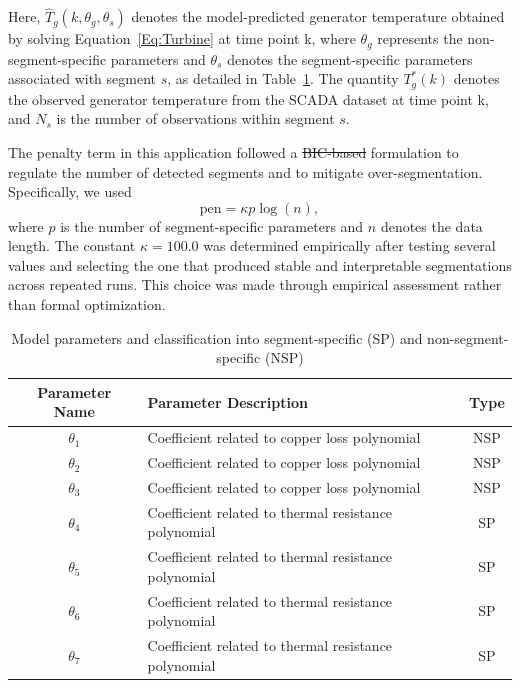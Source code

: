 \documentclass[10pt,letterpaper]{article}
\makeatletter
\providecommand{\DIFaddtex}[1]{{\protect\color{blue}\uwave{#1}}} %
\providecommand{\DIFdeltex}[1]{{\protect\color{red}\sout{#1}}} %
\providecommand{\DIFaddbegin}{} %
\providecommand{\DIFaddend}{} %
\providecommand{\DIFdelbegin}{} %
\providecommand{\DIFdelend}{} %
\providecommand{\DIFadd}[1]{\texorpdfstring{\DIFaddtex{#1}}{#1}} %
\providecommand{\DIFdel}[1]{\texorpdfstring{\DIFdeltex{#1}}{}} %
\providecommand{\DIFscaledelfig}{0.5}
\newlength{\DIFdelgraphicswidth} %
\newlength{\DIFdelgraphicsheight} %
\providecommand{\DIFaddincludegraphics}[2][]{{\color{blue}\fbox{\DIFOincludegraphics[#1]{#2}}}} %
\providecommand{\DIFdelincludegraphics}[2][]{%
\sbox{\DIFdelgraphicsbox}{\DIFOincludegraphics[#1]{#2}}%
\settoboxwidth{\DIFdelgraphicswidth}{\DIFdelgraphicsbox} %
\settoboxtotalheight{\DIFdelgraphicsheight}{\DIFdelgraphicsbox} %
\scalebox{\DIFscaledelfig}{%
\parbox[b]{\DIFdelgraphicswidth}{\usebox{\DIFdelgraphicsbox}\\[-\baselineskip] \rule{\DIFdelgraphicswidth}{0em}}\llap{\resizebox{\DIFdelgraphicswidth}{\DIFdelgraphicsheight}{%
\setlength{\unitlength}{\DIFdelgraphicswidth}%
\begin{picture}(1,1)%
\thicklines\linethickness{2pt} %
{\color[rgb]{1,0,0}\put(0,0){\framebox(1,1){}}}%
{\color[rgb]{1,0,0}\put(0,0){\line( 1,1){1}}}%
{\color[rgb]{1,0,0}\put(0,1){\line(1,-1){1}}}%
\end{picture}%
}\hspace*{3pt}}} %
} %
\DeclareRobustCommand{\DIFaddbegin}{\DIFOaddbegin \let\includegraphics\DIFaddincludegraphics} %
\DeclareRobustCommand{\DIFaddend}{\DIFOaddend \let\includegraphics\DIFOincludegraphics} %
\DeclareRobustCommand{\DIFdelbegin}{\DIFOdelbegin \let\includegraphics\DIFdelincludegraphics} %
\DeclareRobustCommand{\DIFdelend}{\DIFOaddend \let\includegraphics\DIFOincludegraphics} %
\let\sout@orig\sout %
\renewcommand{\sout}[1]{\ifmmode\text{\sout@orig{\ensuremath{#1}}}\else\sout@orig{#1}\fi} %
\makeatother
\begin{document}
Here, \(\hat{T}_g(k,\theta_g,\theta_s)\) denotes the model-predicted
generator temperature obtained by solving
Equation~\ref{Eq:Turbine} at time point k, where \(\theta_g\) represents the
non-segment-specific parameters and
\(\theta_s\) denotes the segment-specific parameters associated with
segment \(s\), as detailed in Table~\ref{table:TurbinParameters}.
The quantity \(T_g^*(k)\) denotes the observed generator temperature
from the SCADA dataset at time point k, and \(N_s\) is the number of observations within
segment \(s\).

The penalty term in this application followed a \DIFdelbegin \DIFdel{BIC-based }\DIFdelend \DIFaddbegin \DIFadd{complexity-penalty }\DIFaddend formulation to regulate the number of detected segments and to mitigate over-segmentation. Specifically, we used
\[
\text{pen} = \kappa  p  \log(n),
\]
where \( p \) is the number of segment-specific parameters and \( n \) denotes the data length. The constant \( \kappa = 100.0 \) was determined empirically after testing several values and selecting the one that produced stable and interpretable segmentations across repeated runs. This choice was made through empirical assessment rather than formal optimization.

\begin{table}[h]
\centering
\begin{tabular}{|c|l|c|}
\hline
\textbf{Parameter Name} & \textbf{Parameter Description} & \textbf{Type} \\ \hline
\(\theta_1\) & Coefficient related to copper loss polynomial  & NSP \\ \hline
\(\theta_2\) & Coefficient related to copper loss polynomial  & NSP \\ \hline
\(\theta_3\) & Coefficient related to copper loss polynomial  & NSP \\ \hline
\(\theta_4\) & Coefficient related to thermal resistance polynomial  & SP \\ \hline
\(\theta_5\) & Coefficient related to thermal resistance polynomial  & SP \\ \hline
\(\theta_6\) & Coefficient related to thermal resistance polynomial  & SP \\ \hline
\(\theta_7\) & Coefficient related to thermal resistance polynomial  & SP \\ \hline
\end{tabular}
\caption{Model parameters and classification into segment-specific (SP) and non-segment-specific (NSP)}
\label{table:TurbinParameters}
\end{table}
\end{document}
